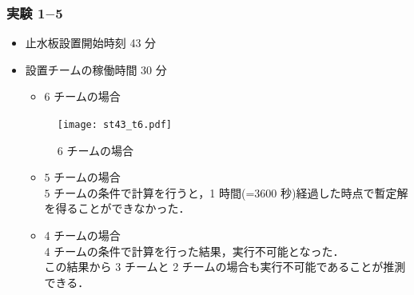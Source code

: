 \documentclass[a4paper,12pt,fleqn]{jarticle}
\begin{document}
\subsubsection{実験 1$-$5}
\begin{itemize}
\item 止水板設置開始時刻 43 分
\item 設置チームの稼働時間 30 分



\begin{itemize}
\item $6$ チームの場合\\
\end{itemize}

\begin{figure}[H]
\begin{center}
  \texttt{[image: st43\_t6.pdf]}
  \caption{6 チームの場合}
  \label{fig:st43_t6}
  \end{center}
\end{figure}


\begin{itemize}
\item $5$ チームの場合\\
$5$ チームの条件で計算を行うと，1 時間(=3600 秒)経過した時点で暫定解を得ることができなかった．
\end{itemize}

\begin{itemize}
\item 4 チームの場合\\
4 チームの条件で計算を行った結果，実行不可能となった．\\
この結果から 3 チームと 2 チームの場合も実行不可能であることが推測できる．
\end{itemize}

\begin{table}[H]
\begin{center}
\caption{計算結果}
\label{実験1_5_1}
\end{center}
\end{table}
\end{itemize}
\end{document}
